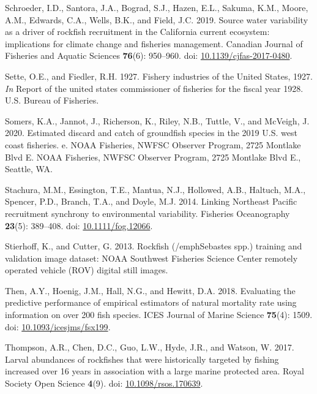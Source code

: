 \documentclass[
  english,
  a4paper,
]{article}
\newlength{\cslhangindent}
\newlength{\cslentryspacingunit} %
\newenvironment{CSLReferences}[2] %
 {%
  \setlength{\parindent}{0pt}
  \ifodd #1
  \let\oldpar\par
  \def\par{\hangindent=\cslhangindent\oldpar}
  \fi
  \setlength{\parskip}{#2\cslentryspacingunit}
 }%
 {}
\begin{document}
\begin{CSLReferences}{1}{0}
\leavevmode{}%
Schroeder, I.D., Santora, J.A., Bograd, S.J., Hazen, E.L., Sakuma, K.M., Moore, A.M., Edwards, C.A., Wells, B.K., and Field, J.C. 2019. {Source water variability as a driver of rockfish recruitment in the California current ecosystem: implications for climate change and fisheries management}. Canadian Journal of Fisheries and Aquatic Sciences \textbf{76}(6): 950--960. doi: \href{https://doi.org/10.1139/cjfas-2017-0480}{10.1139/cjfas-2017-0480}.

\leavevmode{}%
Sette, O.E., and Fiedler, R.H. 1927. {Fishery industries of the United States, 1927}. \emph{In} Report of the united states commissioner of fisheries for the fiscal year 1928. U.S. Bureau of Fisheries.

\leavevmode{}%
Somers, K.A., Jannot, J., Richerson, K., Riley, N.B., Tuttle, V., and McVeigh, J. 2020. {Estimated discard and catch of groundfish species in the 2019 U.S. west coast fisheries. e}. NOAA Fisheries, NWFSC Observer Program, 2725 Montlake Blvd E. NOAA Fisheries, NWFSC Observer Program, 2725 Montlake Blvd E., Seattle, WA.

\leavevmode{}%
Stachura, M.M., Essington, T.E., Mantua, N.J., Hollowed, A.B., Haltuch, M.A., Spencer, P.D., Branch, T.A., and Doyle, M.J. 2014. {Linking Northeast Pacific recruitment synchrony to environmental variability}. Fisheries Oceanography \textbf{23}(5): 389--408. doi: \href{https://doi.org/10.1111/fog.12066}{10.1111/fog.12066}.

\leavevmode{}%
Stierhoff, K., and Cutter, G. 2013. {Rockfish (/emph{Sebastes spp.}) training and validation image dataset: NOAA Southwest Fisheries Science Center remotely operated vehicle (ROV) digital still images.}

\leavevmode{}%
Then, A.Y., Hoenig, J.M., Hall, N.G., and Hewitt, D.A. 2018. {Evaluating the predictive performance of empirical estimators of natural mortality rate using information on over 200 fish species}. ICES Journal of Marine Science \textbf{75}(4): 1509. doi: \href{https://doi.org/10.1093/icesjms/fsx199}{10.1093/icesjms/fsx199}.

\leavevmode{}%
Thompson, A.R., Chen, D.C., Guo, L.W., Hyde, J.R., and Watson, W. 2017. {Larval abundances of rockfishes that were historically targeted by fishing increased over 16 years in association with a large marine protected area}. Royal Society Open Science \textbf{4}(9). doi: \href{https://doi.org/10.1098/rsos.170639}{10.1098/rsos.170639}.


\end{CSLReferences}
\end{document}
